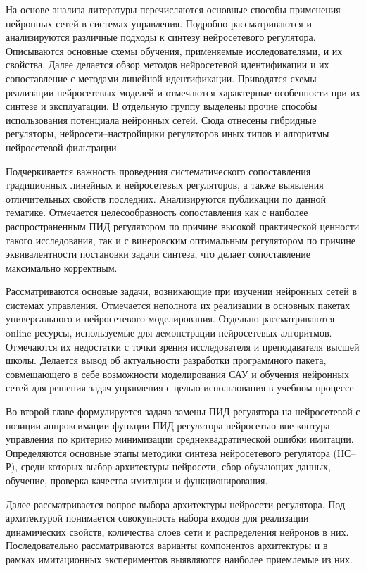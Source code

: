 На основе анализа литературы перечисляются основные способы применения
нейронных сетей в системах управления.  Подробно рассматриваются и
анализируются различные подходы к синтезу нейросетевого регулятора.
Описываются основные схемы обучения, применяемые исследователями, и их
свойства.  Далее делается обзор методов нейросетевой идентификации и
их сопоставление с методами линейной идентификации.  Приводятся схемы
реализации нейросетевых моделей и отмечаются характерные особенности
при их синтезе и эксплуатации.  В отдельную группу выделены прочие
способы использования потенциала нейронных сетей.  Сюда отнесены
гибридные регуляторы, нейросети--настройщики регуляторов иных типов и
алгоритмы нейросетевой фильтрации.

Подчеркивается важность проведения систематического сопоставления
традиционных линейных и нейросетевых регуляторов, а также выявления
отличительных свойств последних.  Анализируются публикации по данной
тематике.  Отмечается целесообразность сопоставления как с наиболее
распространенным ПИД регулятором по причине высокой практической
ценности такого исследования, так и с винеровским оптимальным
регулятором по причине эквивалентности постановки задачи синтеза, что
делает сопоставление максимально корректным.

Рассматриваются основые задачи, возникающие при изучении нейронных
сетей в системах управления.  Отмечается неполнота их реализации в
основных пакетах универсального и нейросетевого моделирования.
Отдельно рассматриваются online-ресурсы, используемые для демонстрации
нейросетевых алгоритмов.  Отмечаются их недостатки с точки зрения
исследователя и преподавателя высшей школы.  Делается вывод об
актуальности разработки программного пакета, совмещающего в себе
возможности моделирования САУ и обучения нейронных сетей для решения
задач управления с целью использования в учебном процессе.


Во второй главе формулируется задача замены ПИД регулятора на
нейросетевой с позиции аппроксимации функции ПИД регулятора нейросетью
вне контура управления по критерию минимизации среднеквадратической
ошибки имитации.  Определяются основные этапы методики синтеза
нейросетевого регулятора (НС--Р), среди которых выбор архитектуры
нейросети, сбор обучающих данных, обучение, проверка качества имитации
и функционирования.

Далее рассматривается вопрос выбора архитектуры нейросети регулятора.
Под архитектурой понимается совокупность набора входов для реализации
динамических свойств, количества слоев сети и распределения нейронов в
них.  Последовательно рассматриваются варианты компонентов архитектуры
и в рамках имитационных экспериментов выявляются наиболее приемлемые
из них.

